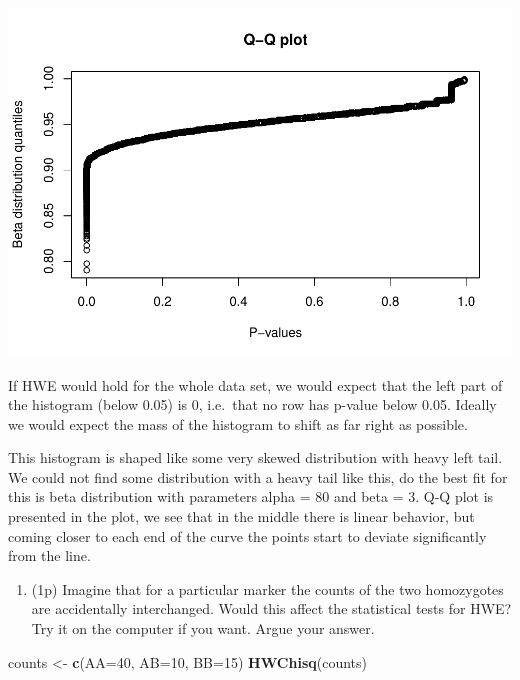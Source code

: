 \documentclass[
]{article}
\newenvironment{Shaded}{\begin{snugshade}}{\end{snugshade}}
\newcommand{\DataTypeTok}[1]{\textcolor[rgb]{0.13,0.29,0.53}{#1}}
\newcommand{\DecValTok}[1]{\textcolor[rgb]{0.00,0.00,0.81}{#1}}
\newcommand{\KeywordTok}[1]{\textcolor[rgb]{0.13,0.29,0.53}{\textbf{#1}}}
\newcommand{\NormalTok}[1]{#1}
\newcommand{\StringTok}[1]{\textcolor[rgb]{0.31,0.60,0.02}{#1}}
\providecommand{\tightlist}{%
  \setlength{\itemsep}{0pt}\setlength{\parskip}{0pt}}
\begin{document}
\includegraphics{P022020_HWE_files/figure-latex/14th-2.pdf}

If HWE would hold for the whole data set, we would expect that the left
part of the histogram (below 0.05) is 0, i.e.~that no row has p-value
below 0.05. Ideally we would expect the mass of the histogram to shift
as far right as possible.

This histogram is shaped like some very skewed distribution with heavy
left tail. We could not find some distribution with a heavy tail like
this, do the best fit for this is beta distribution with parameters
alpha = 80 and beta = 3. Q-Q plot is presented in the plot, we see that
in the middle there is linear behavior, but coming closer to each end of
the curve the points start to deviate significantly from the line.

\begin{enumerate}
\def\labelenumi{\arabic{enumi}.}
\setcounter{enumi}{14}
\tightlist
\item
  (1p) Imagine that for a particular marker the counts of the two
  homozygotes are accidentally interchanged. Would this affect the
  statistical tests for HWE? Try it on the computer if you want. Argue
  your answer.
\end{enumerate}

\begin{Shaded}
\begin{Highlighting}[]
\NormalTok{counts <-}\StringTok{ }\KeywordTok{c}\NormalTok{(}\DataTypeTok{AA=}\DecValTok{40}\NormalTok{, }\DataTypeTok{AB=}\DecValTok{10}\NormalTok{, }\DataTypeTok{BB=}\DecValTok{15}\NormalTok{)}
\KeywordTok{HWChisq}\NormalTok{(counts)}
\end{Highlighting}
\end{Shaded}
\end{document}
